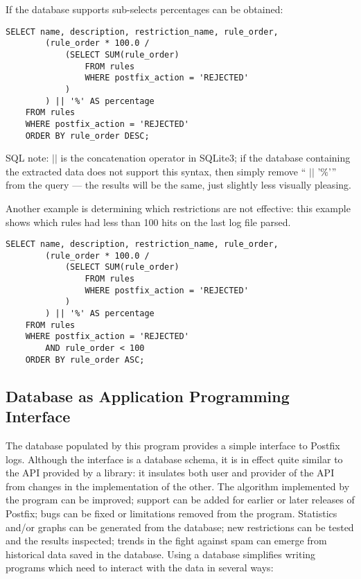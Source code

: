 \documentclass[a4paper,12pt,draft]{article}
\begin{document}
If the database supports sub-selects percentages can be
obtained:

\begin{verbatim}
SELECT name, description, restriction_name, rule_order,
        (rule_order * 100.0 /
            (SELECT SUM(rule_order)
                FROM rules
                WHERE postfix_action = 'REJECTED'
            )
        ) || '%' AS percentage
    FROM rules
    WHERE postfix_action = 'REJECTED'
    ORDER BY rule_order DESC;
\end{verbatim}

SQL note: $||$ is the concatenation operator in SQLite3; if the database
containing the extracted data does not support this syntax, then simply
remove `` $||$ '$\%$'\hspace{1ex}'' from the query --- the results will be
the same, just slightly less visually pleasing.

Another example is determining which restrictions are not effective: this
example shows which rules had less than 100 hits on the last log file
parsed.

\begin{verbatim}
SELECT name, description, restriction_name, rule_order,
        (rule_order * 100.0 /
            (SELECT SUM(rule_order)
                FROM rules
                WHERE postfix_action = 'REJECTED'
            )
        ) || '%' AS percentage
    FROM rules
    WHERE postfix_action = 'REJECTED'
        AND rule_order < 100
    ORDER BY rule_order ASC;
\end{verbatim}

\subsection{Database as Application Programming Interface}

The database populated by this program provides a simple interface to
Postfix logs.  Although the interface is a database schema, it is in effect
quite similar to the API provided by a library: it insulates both user and
provider of the API from changes in the implementation of the other.  The
algorithm implemented by the program can be improved; support can be added
for earlier or later releases of Postfix; bugs can be fixed or limitations
removed from the program.  Statistics and/or graphs can be generated from
the database; new restrictions can be tested and the results inspected;
trends in the fight against spam can emerge from historical data saved in
the database.  Using a database simplifies writing programs which need to
interact with the data in several ways:
\end{document}
